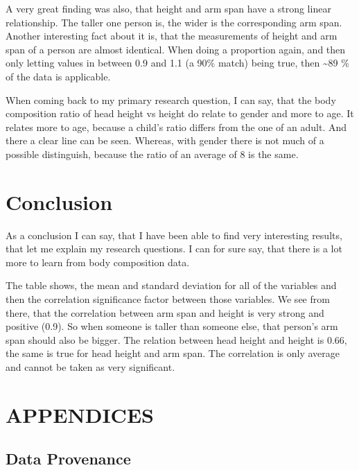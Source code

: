 \documentclass[]{article}
\begin{document}
A very great finding was also, that height and arm span have a strong
linear relationship. The taller one person is, the wider is the
corresponding arm span. Another interesting fact about it is, that the
measurements of height and arm span of a person are almost identical.
When doing a proportion again, and then only letting values in between
0.9 and 1.1 (a 90\% match) being true, then \textasciitilde89 \% of the
data is applicable.

When coming back to my primary research question, I can say, that the
body composition ratio of head height vs height do relate to gender and
more to age. It relates more to age, because a child's ratio differs
from the one of an adult. And there a clear line can be seen. Whereas,
with gender there is not much of a possible distinguish, because the
ratio of an average of 8 is the same.

\section{Conclusion}
\label{sec:conclusion}

As a conclusion I can say, that I have been able to find very
interesting results, that let me explain my research questions. I can
for sure say, that there is a lot more to learn from body composition
data.

\newpage



The table shows, the mean and standard deviation for all of the
variables and then the correlation significance factor between those
variables. We see from there, that the correlation between arm span and
height is very strong and positive (0.9). So when someone is taller than
someone else, that person's arm span should also be bigger. The relation
between head height and height is 0.66, the same is true for head height
and arm span. The correlation is only average and cannot be taken as
very significant.

\newpage

\section{APPENDICES}
\label{sec:appendix}

\subsection{Data Provenance}
\label{sec:appendix-data-provenance}
\end{document}
